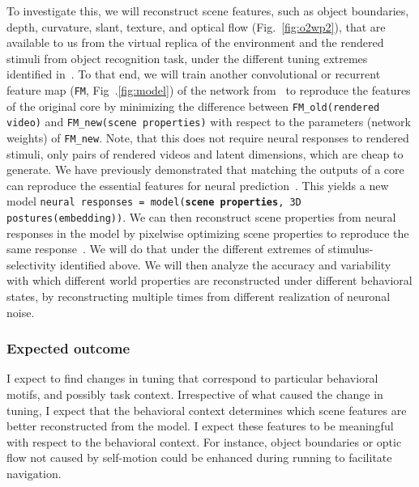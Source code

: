 \documentclass[B2,COG]{ercgrant}
\begin{document}
To investigate this, we will reconstruct scene features, such as object boundaries, depth, curvature, slant, texture, and optical flow (Fig.~\ref{fig:o2wp2}), that are available to us from the virtual replica of the environment and the rendered stimuli from object recognition task, under the different tuning extremes identified in~.
To that end, we will train another convolutional or recurrent feature map (\texttt{FM}, Fig~.\ref{fig:model}) of the network from~ to reproduce the features of the original core by minimizing the difference between 
    \texttt{FM\_old(rendered video)} and \texttt{FM\_new(scene properties)}
with respect to the parameters (network weights) of \texttt{FM\_new}. 
Note, that this does not require neural responses to rendered stimuli, only pairs of rendered videos and latent dimensions, which are cheap to generate. 
We have previously demonstrated that matching the outputs of a core can reproduce the essential features for neural prediction~\parencite{Safarani2021-yy}.
This yields a new model \texttt{neural responses = model(\textbf{scene properties}, 3D postures(embedding))}.
We can then reconstruct scene properties from neural responses in the model by pixelwise optimizing scene properties to reproduce the same response~\parencite{Cobos2022-rr}.
We will do that under the different extremes of stimulus-selectivity identified above.
We will then analyze the accuracy and variability with which different world properties are reconstructed under different behavioral states, by reconstructing multiple times from different realization of neuronal noise.

\subsubsection{Expected outcome} 
I expect to find changes in tuning that correspond to particular behavioral motifs, and possibly task context.
Irrespective of what caused the change in tuning, I expect that the behavioral context determines which scene features are better reconstructed from the model.
I expect these features to be meaningful with respect to the behavioral context. 
For instance, object boundaries or optic flow not caused by self-motion could be enhanced during running to facilitate navigation. 
\end{document}
